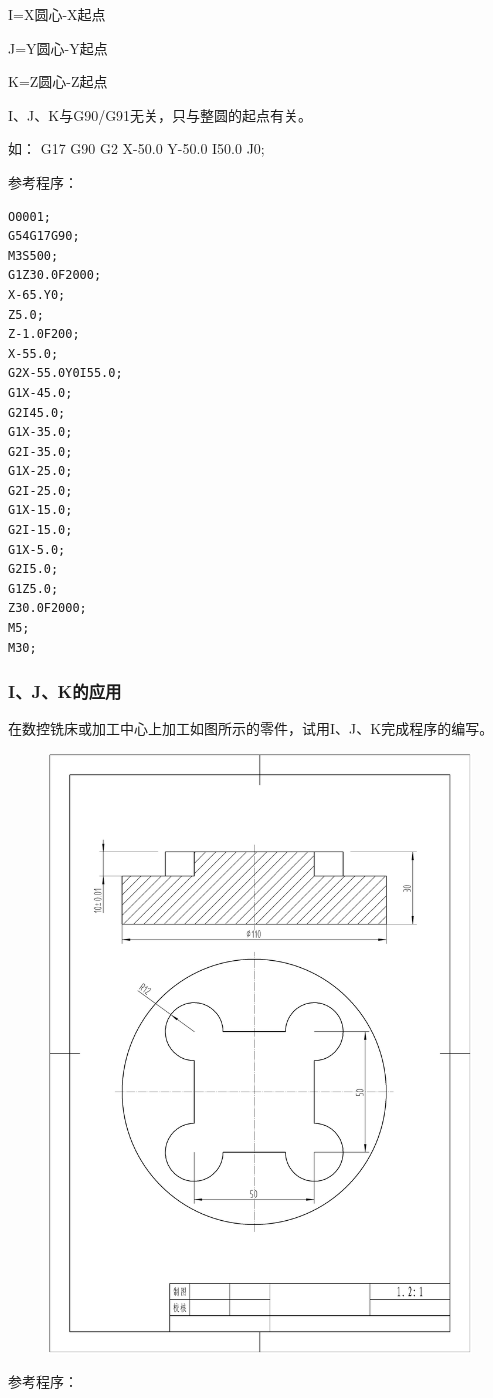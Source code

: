 I=X圆心-X起点

J=Y圆心-Y起点

K=Z圆心-Z起点

I、J、K与G90/G91无关，只与整圆的起点有关。

如： G17 G90 G2 X-50.0 Y-50.0 I50.0 J0;

参考程序：

\begin{lstlisting}
O0001;
G54G17G90;
M3S500;
G1Z30.0F2000;
X-65.Y0;
Z5.0;
Z-1.0F200;
X-55.0;
G2X-55.0Y0I55.0;
G1X-45.0;
G2I45.0;
G1X-35.0;
G2I-35.0;
G1X-25.0;
G2I-25.0;
G1X-15.0;
G2I-15.0;
G1X-5.0;
G2I5.0;
G1Z5.0;
Z30.0F2000;
M5;
M30;
\end{lstlisting}

\subsubsection{I、J、K的应用}
在数控铣床或加工中心上加工如图所示的零件，试用I、J、K完成程序的编写。
\begin{figure}[h]
    \centering
    \includegraphics[width=0.8\linewidth,trim=50 150 50 100,clip]{data/image/5-4.jpg}
    \caption{}
    \label{fig:5-4}
\end{figure}
参考程序：

